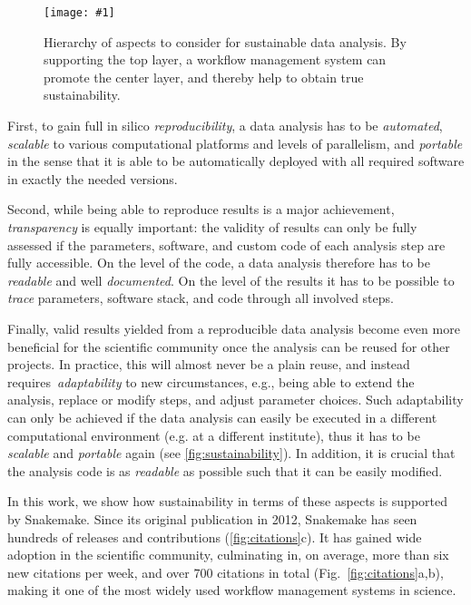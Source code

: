 \documentclass[parskip=half]{scrartcl}
\newcommand{\image}[1]{\centering\texttt{[image: \#1]}}
\begin{document}
\begin{figure}
	\image{sustainability-in-wms.pdf}
	\caption{
		Hierarchy of aspects to consider for sustainable data analysis.
		By supporting the top layer, a workflow management system can promote the center layer, and thereby help to obtain true sustainability.
	}\label{fig:sustainability}
\end{figure}

First, to gain full in silico \emph{reproducibility}, a data analysis has to be \emph{automated}, \emph{scalable} to various computational platforms and levels of parallelism, and \emph{portable} in the sense that it is able to be automatically deployed with all required software in exactly the needed versions.

Second, while being able to reproduce results is a major achievement, \emph{transparency} is equally important: the validity of results can only be fully assessed if the parameters, software, and custom code of each analysis step are fully accessible.
On the level of the code, a data analysis therefore has to be \emph{readable} and well \emph{documented}.
On the level of the results it has to be possible to \emph{trace} parameters, software stack, and code through all involved steps.

Finally, valid results yielded from a reproducible data analysis become even more beneficial for the scientific community once the analysis can be reused for other projects.
In practice, this will almost never be a plain reuse, and instead requires~\emph{adaptability} to new circumstances, e.g., being able to extend the analysis, replace or modify steps, and adjust parameter choices.
Such adaptability can only be achieved if the data analysis can easily be executed in a different computational environment (e.g. at a different institute), thus it has to be \emph{scalable} and \emph{portable} again (see \autoref{fig:sustainability}).
In addition, it is crucial that the analysis code is as \emph{readable} as possible such that it can be easily modified.

In this work, we show how sustainability in terms of these aspects is supported by Snakemake.
Since its original publication in 2012, Snakemake has seen hundreds of releases and contributions (\autoref{fig:citations}c).
It has gained wide adoption in the scientific community, culminating in, on average, more than six new citations per week, and over 700 citations in total (Fig.~\ref{fig:citations}a,b), making it one of the most widely used workflow management systems in science.
\end{document}
